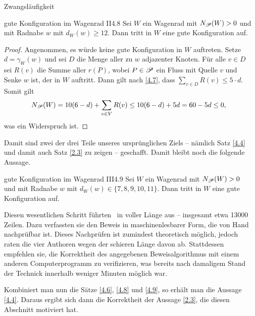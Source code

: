 \begin{section}{Zwangsläufigkeit}
 \begin{satzl}{gute Konfiguration im Wagenrad II}{4.8}
  Sei $W$ ein Wagenrad mit $N_{\mathscr{P}}(W) > 0$ und mit Radnabe $w$ mit $d_W(w) \geq 12$. Dann tritt in $W$ eine gute Konfiguration auf.
 \end{satzl}
 
 \begin{proof}
  Angenommen, es würde keine gute Konfiguration in $W$ auftreten. Setze $d = \gamma_W(w)$ und sei $D$ die Menge aller zu $w$ adjazenter Knoten. Für alle $v \in D$ sei $R(v)$ die Summe aller $r(P)$, wobei $P \in \mathscr{P}$ ein Fluss mit Quelle $v$ und Senke $w$ ist, der in $W$ auftritt. Dann gilt nach \ref{4.7}, dass $\sum_{v \in D} R(v) \leq 5\cdot d$. Somit gilt
  \[ N_{\mathscr{P}}(W) = 10(6-d) + \sum_{v \in V} R(v) \leq 10(6-d) + 5d = 60 - 5d \leq 0 \text{,}\]
  was ein Widerspruch ist.
 \end{proof}

 Damit sind zwei der drei Teile unseres ursprünglichen Ziels -- nämlich Satz \ref{4.4} und damit auch Satz \ref{2.3} zu zeigen -- geschafft. Damit bleibt noch die folgende Aussage.

 \begin{satzl}{gute Konfiguration im Wagenrad III}{4.9}
  Sei $W$ ein Wagenrad mit $N_{\mathscr{P}}(W) > 0$ und mit Radnabe $w$ mit $d_W(w) \in \{7,8,9,10,11\}$. Dann tritt in $W$ eine gute Konfiguration auf.
 \end{satzl}
 
 Diesen wesentlichen Schritt führten \rsst\-\ in voller Länge aus -- insgesamt etwa 13000 Zeilen. Dazu verfassten sie den Beweis in maschinenlesbarer Form, die von Hand nachprüfbar ist. Dieses Nachprüfen ist zumindest theoretisch möglich, jedoch raten die vier Authoren wegen der schieren Länge davon ab. Stattdessen empfehlen sie, die Korrektheit des angegebenen Beweisalgorithmus mit einem anderen Computerprogramm zu verifizieren, was bereits nach damaligem Stand der Technick innerhalb weniger Minuten möglich war.

 Kombiniert man nun die Sätze \ref{4.6}, \ref{4.8} und \ref{4.9}, so erhält man die Aussage \ref{4.4}. Daraus ergibt sich dann die Korrektheit der Aussage \ref{2.3}, die diesen Abschnitt motiviert hat.



\end{section}
